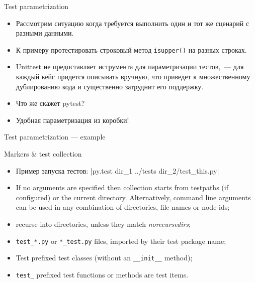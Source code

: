 \documentclass{beamer}
\begin{document}
\begin{frame}[fragile]{Test parametrization}
    \begin{itemize}
    \item Рассмотрим ситуацию когда требуется выполнить один и тот же сценарий с разными данными.
    \pause \item К примеру протестировать строковый метод \verb|isupper()| на разных строках.
    \pause \item Unittest не предоставляет иструмента для параметризации тестов,~--- для каждый кейс придется описывать вручную, что приведет к множественному дублированию кода и существенно затруднит его поддержку.
    \pause \item Что же скажет pytest?
    \pause \item Удобная параметризация из коробки!
    \end{itemize}
\end{frame}

\begin{frame}[fragile]{Test parametrization --- example}
\end{frame}

\begin{frame}[fragile]{Markers \& test collection}
    \begin{itemize}
    \item Пример запуска тестов:
        |py.test dir_1 ../tests dir_2/test_this.py|
    \pause \item If no arguments are specified then collection starts from testpaths (if configured) or the current directory. Alternatively, command line arguments can be used in any combination of directories, file names or node ids;
    \pause \item recurse into directories, unless they match \emph{norecursedirs};
    \pause \item \verb|test_*.py| or \verb|*_test.py| files, imported by their test package name;
    \pause \item Test prefixed test classes (without an \verb|__init__| method);
    \pause \item \verb|test_| prefixed test functions or methods are test items.
    \end{itemize}
\end{frame}
\end{document}
